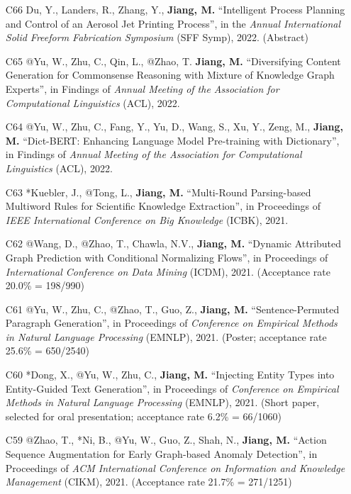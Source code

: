 \documentclass[10pt]{article}
\newenvironment{myindentpar}[1]%
{\begin{list}{}%
         {\setlength{\leftmargin}{#1}}%
         \item[]%
}
{\end{list}}
\newcounter{list}
\begin{document}
\begin{myindentpar}{0.00cm}
\begin{enumerate}[leftmargin=.5cm]
\item[C66] Du, Y., Landers, R., Zhang, Y., \textbf{Jiang, M.} ``Intelligent Process Planning and Control of an Aerosol Jet Printing Process'', in the \textit{Annual International Solid Freeform Fabrication Symposium} (SFF Symp), 2022. (Abstract)

\item[C65] @Yu, W., Zhu, C., Qin, L., @Zhao, T. \textbf{Jiang, M.} ``Diversifying Content Generation for Commonsense Reasoning with Mixture of Knowledge Graph Experts'', in Findings of \textit{Annual Meeting of the Association for Computational Linguistics} (ACL), 2022.

\item[C64] @Yu, W., Zhu, C., Fang, Y., Yu, D., Wang, S., Xu, Y., Zeng, M., \textbf{Jiang, M.} ``Dict-BERT: Enhancing Language Model Pre-training with Dictionary'', in Findings of \textit{Annual Meeting of the Association for Computational Linguistics} (ACL), 2022.

\item[C63] *Kuebler, J., @Tong, L., \textbf{Jiang, M.} ``Multi-Round Parsing-based Multiword Rules for Scientific Knowledge Extraction'', in Proceedings of \textit{IEEE International Conference on Big Knowledge} (ICBK), 2021.
		
\item[C62] @Wang, D., @Zhao, T., Chawla, N.V., \textbf{Jiang, M.} ``Dynamic Attributed Graph Prediction with Conditional Normalizing Flows'', in Proceedings of \textit{International Conference on Data Mining} (ICDM), 2021. (Acceptance rate 20.0\% = 198/990)

\item[C61] @Yu, W., Zhu, C., @Zhao, T., Guo, Z., \textbf{Jiang, M.} ``Sentence-Permuted Paragraph Generation'', in Proceedings of \textit{Conference on Empirical Methods in Natural Language Processing} (EMNLP), 2021. (Poster; acceptance rate 25.6\% = 650/2540)

\item[C60] *Dong, X., @Yu, W., Zhu, C., \textbf{Jiang, M.} ``Injecting Entity Types into Entity-Guided Text Generation'', in Proceedings of \textit{Conference on Empirical Methods in Natural Language Processing} (EMNLP), 2021. (Short paper, selected for oral presentation; acceptance rate 6.2\% = 66/1060)

\item[C59] @Zhao, T., *Ni, B., @Yu, W., Guo, Z., Shah, N., \textbf{Jiang, M.} ``Action Sequence Augmentation for Early Graph-based Anomaly Detection'', in Proceedings of \textit{ACM International Conference on Information and Knowledge Management} (CIKM), 2021. (Acceptance rate 21.7\% = 271/1251)
		

\end{enumerate}
\end{myindentpar}
\end{document}
